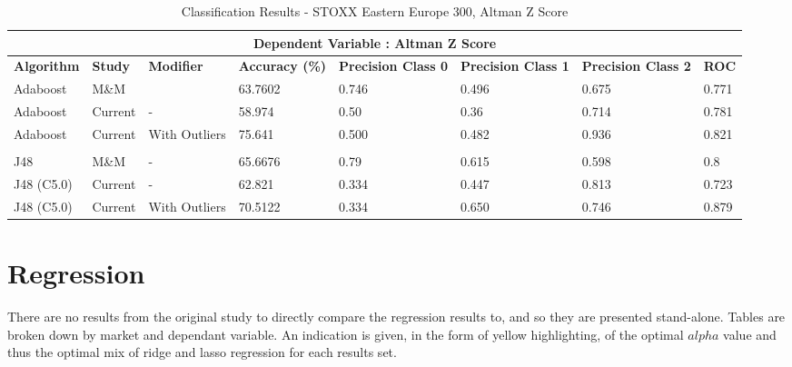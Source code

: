 \begin{table}[h]
\centering
\begin{sideways}%
\begin{tabular}{ |p{2.2cm}|p{1.55cm}|p{2.5cm}||p{2cm}|p{2cm}|p{2cm}|p{2cm}|p{1cm}|  }
 \hline
 \multicolumn{8}{|c|}{\bf Dependent Variable : Altman Z Score} \\
 \hline
 {\bf Algorithm} & {\bf Study} & {\bf Modifier} & {\bf Accuracy (\%)} & {\bf Precision Class 0} & {\bf Precision Class 1} &  {\bf Precision Class 2} & {\bf ROC} \\
 \hline
 Adaboost  & M\&M & & 63.7602  & 0.746 &  0.496 & 0.675 & 0.771  \\
   \rowcolor{gray}Adaboost  & Current & - &58.974 & 0.50 & 0.36 & 0.714  & 0.781  \\
 Adaboost  & Current & With Outliers &75.641 & 0.500 & 0.482 &  0.936 & 0.821  \\
   & & & & & & &\\
    \rowcolor{gray}J48  & M\&M & - & 65.6676  & 0.79 &  0.615 & 0.598 & 0.8  \\
  J48 (C5.0) & Current & - &62.821 & 0.334 & 0.447  & 0.813  &  0.723 \\
    \rowcolor{gray}J48 (C5.0) & Current & With Outliers &70.5122 & 0.334 & 0.650  & 0.746 & 0.879  \\
 \hline
\end{tabular}
\end{sideways}
\caption{Classification Results  - STOXX Eastern Europe 300, Altman Z Score}
\end{table}









\clearpage
\section{Regression}\label{S.regression4}
{There are no results from the original study to directly compare the regression results to, and so they are presented stand-alone. Tables are broken down by market and dependant variable.  An indication is given, in the form of yellow highlighting, of the optimal $alpha$ value and thus the optimal mix of ridge and lasso regression for each results set.  }\clearpage
